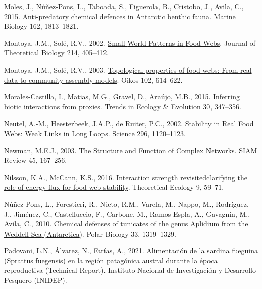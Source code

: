 \documentclass[preprint, 3p,
authoryear]{elsarticle} %
\newlength{\cslhangindent}
\newlength{\cslentryspacingunit} %
\newenvironment{CSLReferences}[2] %
 {%
  \setlength{\parindent}{0pt}
  \ifodd #1
  \let\oldpar\par
  \def\par{\hangindent=\cslhangindent\oldpar}
  \fi
  \setlength{\parskip}{#2\cslentryspacingunit}
 }%
 {}
\begin{document}
\begin{CSLReferences}{1}{0}
\leavevmode{}%
Moles, J., Núñez-Pons, L., Taboada, S., Figuerola, B., Cristobo, J.,
Avila, C., 2015.
\href{https://doi.org/10.1007/s00227-015-2714-9}{Anti-predatory chemical
defences in {Antarctic} benthic fauna}. Marine Biology 162, 1813--1821.

\leavevmode{}%
Montoya, J.M., Solé, R.V., 2002.
\href{https://doi.org/10.1006/jtbi.2001.2460}{Small {World Patterns} in
{Food Webs}}. Journal of Theoretical Biology 214, 405--412.

\leavevmode{}%
Montoya, J.M., Solé, R.V., 2003.
\href{https://doi.org/10.1034/j.1600-0706.2003.12031.x}{Topological
properties of food webs: From real data to community assembly models}.
Oikos 102, 614--622.

\leavevmode{}%
Morales-Castilla, I., Matias, M.G., Gravel, D., Araújo, M.B., 2015.
\href{https://doi.org/10.1016/j.tree.2015.03.014}{Inferring biotic
interactions from proxies}. Trends in Ecology \& Evolution 30, 347--356.

\leavevmode{}%
Neutel, A.-M., Heesterbeek, J.A.P., de Ruiter, P.C., 2002.
\href{https://doi.org/10.1126/science.1068326}{Stability in {Real Food
Webs}: {Weak Links} in {Long Loops}}. Science 296, 1120--1123.

\leavevmode{}%
Newman, M.E.J., 2003.
\href{https://doi.org/10.1137/S003614450342480}{The {Structure} and
{Function} of {Complex Networks}}. SIAM Review 45, 167--256.

\leavevmode{}%
Nilsson, K.A., McCann, K.S., 2016.
\href{https://doi.org/10.1007/s12080-015-0282-8}{Interaction strength
revisited\textemdash clarifying the role of energy flux for food web
stability}. Theoretical Ecology 9, 59--71.

\leavevmode{}%
Núñez-Pons, L., Forestieri, R., Nieto, R.M., Varela, M., Nappo, M.,
Rodríguez, J., Jiménez, C., Castelluccio, F., Carbone, M., Ramos-Espla,
A., Gavagnin, M., Avila, C., 2010.
\href{https://doi.org/10.1007/s00300-010-0819-7}{Chemical defenses of
tunicates of the genus {Aplidium} from the {Weddell Sea}
({Antarctica})}. Polar Biology 33, 1319--1329.

\leavevmode{}%
Padovani, L.N., Álvarez, N., Farías, A., 2021. Alimentación de la
sardina fueguina ({Sprattus} fuegensis) en la región patagónica austral
durante la época reproductiva (Technical Report). {Instituto Nacional de
Investigación y Desarrollo Pesquero (INIDEP)}.


\end{CSLReferences}
\end{document}
